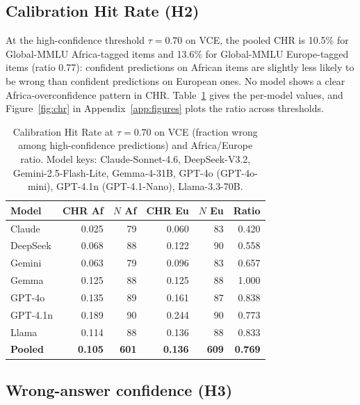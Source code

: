 \documentclass[11pt]{article}
\begin{document}
\subsection{Calibration Hit Rate (H2)}

At the high-confidence threshold $\tau = 0.70$ on VCE, the pooled CHR is 10.5\% for Global-MMLU Africa-tagged items and 13.6\% for Global-MMLU Europe-tagged items (ratio 0.77): confident predictions on African items are slightly less likely to be wrong than confident predictions on European ones. No model shows a clear Africa-overconfidence pattern in CHR. Table~\ref{tab:chr} gives the per-model values, and Figure~\ref{fig:chr} in Appendix~\ref{app:figures} plots the ratio across thresholds.

\begin{table}[t]
\centering
\footnotesize
\setlength{\tabcolsep}{3.5pt}
\begin{tabularx}{\columnwidth}{@{}>{\raggedright\arraybackslash}Xrrrrr@{}}
\toprule
\textbf{Model} & \textbf{CHR Af} & \textbf{$N$ Af} & \textbf{CHR Eu} & \textbf{$N$ Eu} & \textbf{Ratio} \\
\midrule
Claude & 0.025 & 79 & 0.060 & 83 & 0.420 \\
DeepSeek & 0.068 & 88 & 0.122 & 90 & 0.558 \\
Gemini & 0.063 & 79 & 0.096 & 83 & 0.657 \\
Gemma & 0.125 & 88 & 0.125 & 88 & 1.000 \\
\mbox{GPT-4o} & 0.135 & 89 & 0.161 & 87 & 0.838 \\
\mbox{GPT-4.1n} & 0.189 & 90 & 0.244 & 90 & 0.773 \\
Llama & 0.114 & 88 & 0.136 & 88 & 0.833 \\
\midrule
\textbf{Pooled} & \textbf{0.105} & \textbf{601} & \textbf{0.136} & \textbf{609} & \textbf{0.769} \\
\bottomrule
\end{tabularx}
\caption{Calibration Hit Rate at $\tau = 0.70$ on VCE (fraction wrong among high-confidence predictions) and Africa/Europe ratio. Model keys: Claude-Sonnet-4.6, DeepSeek-V3.2, Gemini-2.5-Flash-Lite, Gemma-4-31B, GPT-4o (GPT-4o-mini), GPT-4.1n (GPT-4.1-Nano), Llama-3.3-70B.}
\label{tab:chr}
\end{table}

\subsection{Wrong-answer confidence (H3)}
\end{document}

